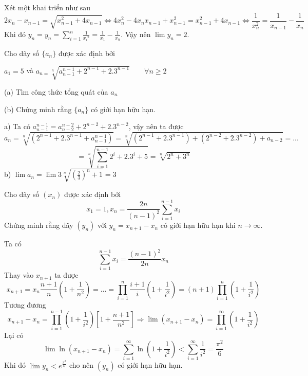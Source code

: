 \documentclass[11pt]{scrartcl}
\begin{document}
\begin{itemize}[label=, leftmargin=0em, itemsep=0.5em]
\begin{sol}
        Xét một khai triển như sau
        \[2x_n - x_{n - 1} = \sqrt{x_{n - 1}^2 + 4x_{n - 1}} \Leftrightarrow 4x_n^2 - 4x_nx_{n - 1} + x_{n -1}^2 = x_{n - 1}^2 + 4x_{n-1} \Leftrightarrow \frac{1}{x_n^2} = \frac{1}{x_{n -1}} - \frac{1}{x_n} \]
        Khi đó $y_n = \displaystyle  y_n=\sum_{i=1}^{n}\frac{1}{{{x}_{i}}^{2}} =  \frac{1}{x_1} - \frac{1}{x_n}$. Vậy nên $\lim y_n = 2$.
    \end{sol}
    \begin{bt}
        Cho dãy số $\{a_{n}\}$ được xác định bởi

$a_{1}=5$ và $a_{n=}\sqrt[n]{a_{n-1}^{n-1}+2^{n-1}+2.3^{n-1}} \qquad \forall n\geq2$

(a) Tìm công thức tổng quát của $a_{n}$

(b) Chứng minh rằng $\{a_{n}\}$ có giới hạn hữu hạn.
        
    \end{bt}

    \begin{sol}
        a) Ta có $a_{n - 1}^{n - 1} = a_{n - 2}^{n -2} + 2^{n -2} + 2.3^{n -2}$, vậy nên ta được
        \[a_n = \sqrt[n]{(2^{n -1} + 2.3^{n -1} + a_{n -1}^{n -1})} = \sqrt[n]{(2^{n -1} + 2.3^{n -1}) + (2^{n -2} + 2.3^{n -2}) +  a_{n - 2}}  =...\] \[=\sqrt[n]{\sum_{i = 1}^{n -1} 2^i + 2.3^i + 5} = \sqrt[n]{2^n + 3^{n}}\]
        b) $\lim a_n = \lim 3\sqrt[n]{\left(\frac{2}{3}\right)^n + 1} = 3$
    \end{sol}
    \begin{bt}
        Cho dãy số $(x_n)$ được xác định bởi
\[x_1=1, x_n=\dfrac{2n}{(n-1)^2}\sum_{i=1}^{n-1}x_i\]
Chứng minh rằng dãy $(y_n)$ với $y_n=x_{n+1}-x_n$ có giới hạn hữu hạn khi $n\to \infty.$
    \end{bt}

    \begin{sol}
        Ta có \[  \sum_{i = 1}^{n -1} x_i = \frac{(n - 1)^2}{2n}x_{n}  \]
        Thay vào $x_{n + 1}$ ta được
        \[x_{n + 1}  = x_n \frac{n + 1}{n}\left(1 + \frac{1}{n^2}\right) = ... = \prod_{i = 1}^n \frac{i + 1}{i}\left(1 + \frac{1}{i^2}\right) = (n + 1)\prod_{ i =1}^n\left(1 + \frac{1}{i^2}\right)\]
        Tương đương 
        \[x_{n + 1} - x_{n} = \prod_{ i = 1}^{n -1}\left(1 + \frac{1}{i^2}\right)\left[1 + \frac{n + 1}{n^2}\right] \Rightarrow \lim (x_{n + 1} - x_n) = \prod_{ i = 1}^{\infty}\left(1 + \frac{1}{i^2}\right)\]
        Lại có \[\lim \ln(x_{n + 1} - x_n ) = \sum_{i = 1}^{\infty}\ln \left(1 + \frac{1}{i^2}\right) < \sum_{i = 1}^{\infty} \frac{1}{i^2} = \frac{\pi^2}{6}\]
        Khi đó $\lim y_n < e^{\frac{\pi^2}{6}}$ cho nên $(y_n)$ có giới hạn hữu hạn.


\end{sol}
\end{itemize}
\end{document}
